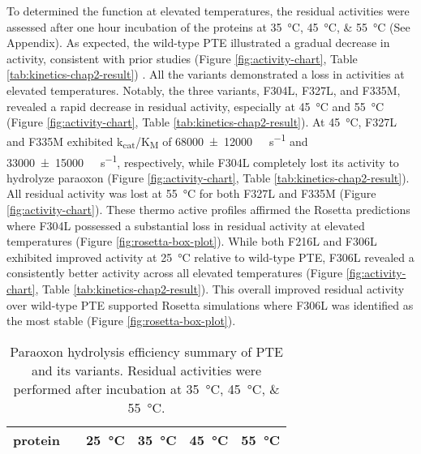 \begin{refsection}
To determined the function at elevated temperatures, the residual activities
were assessed after one hour incubation of the proteins at
\SIlist{35;45;55}{\celsius} (See Appendix). As expected, the wild-type PTE
illustrated a gradual decrease in activity, consistent with prior studies
(Figure \ref{fig:activity-chart}, Table \ref{tab:kinetics-chap2-result})
\cite{Yang2014a,Baker2011b}. All the variants demonstrated a loss in activities
at elevated temperatures. Notably, the three variants, F304L, F327L, and F335M,
revealed a rapid decrease in residual activity, especially at \SI{45}{\celsius}
and \SI{55}{\celsius} (Figure \ref{fig:activity-chart}, Table
\ref{tab:kinetics-chap2-result}). At \SI{45}{\celsius}, F327L and F335M
exhibited k\textsubscript{cat}/K\textsubscript{M} of
\SI{68000\pm12000}{\per\Molar\per\second} and
\SI{33000\pm15000}{\per\Molar\per\second}, respectively, while F304L completely
lost its activity to hydrolyze paraoxon (Figure \ref{fig:activity-chart}, Table
\ref{tab:kinetics-chap2-result}). All residual activity was lost at
\SI{55}{\celsius} for both F327L and F335M (Figure \ref{fig:activity-chart}).
These thermo active profiles affirmed the Rosetta predictions where F304L
possessed a substantial loss in residual activity at elevated temperatures
(Figure \ref{fig:rosetta-box-plot}). While both F216L and F306L exhibited
improved activity at \SI{25}{\celsius} relative to wild-type PTE, F306L
revealed a consistently better activity across all elevated temperatures
(Figure \ref{fig:activity-chart}, Table \ref{tab:kinetics-chap2-result}). This
overall improved residual activity over wild-type PTE supported Rosetta
simulations where F306L was identified as the most stable (Figure
\ref{fig:rosetta-box-plot}).
\begin{table}[htbp]
    \centering
    \caption[Paraoxon hydrolysis efficiency summary of PTE and its variants.
    Residual activities were performed after incubation at
\SIlist{35;45;55}{\celsius}.] {Paraoxon hydrolysis efficiency summary of PTE
    and its variants. Residual activities were performed after incubation at
    \SIlist{35;45;55}{\celsius}.}
    \begin{tabular}{llllll}
    \hline
    protein                 &  & \SI{25}{\celsius} & \SI{35}{\celsius} &
    \SI{45}{\celsius} & \SI{55}{\celsius} \\ 
    \hline
    

\end{tabular}
\end{table}
\end{refsection}
